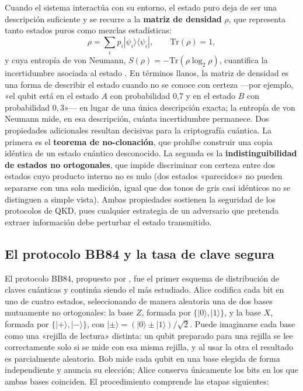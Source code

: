 \documentclass[12pt]{report}
\begin{document}
Cuando el sistema interactúa con su entorno, el estado puro deja de ser una
descripción suficiente y se recurre a la \textbf{matriz de densidad} $\rho$, que
representa tanto estados puros como mezclas estadísticas:
\begin{equation}
\rho = \sum_i p_i |\psi_i\rangle\langle\psi_i|, \qquad \mathrm{Tr}(\rho) = 1,
\label{eq:densidad}
\end{equation}
y cuya entropía de von Neumann, $S(\rho) = -\mathrm{Tr}(\rho \log_2 \rho)$,
cuantifica la incertidumbre asociada al estado \citep{nielsen2010}. En términos
llanos, la matriz de densidad es una forma de describir el estado cuando no se
conoce con certeza —por ejemplo, «el qubit está en el estado $A$ con probabilidad
0{,}7 y en el estado $B$ con probabilidad $0{,}3$»— en lugar de una única
descripción exacta; la entropía de von Neumann mide, en esa descripción, cuánta
incertidumbre permanece. Dos propiedades adicionales resultan decisivas para la
criptografía cuántica. La primera es el \textbf{teorema de no-clonación}, que
prohíbe construir una copia idéntica de un estado cuántico desconocido. La
segunda es la \textbf{indistinguibilidad de estados no ortogonales}, que impide
discriminar con certeza entre dos estados cuyo producto interno no es nulo (dos
estados «parecidos» no pueden separarse con una sola medición, igual que dos
tonos de gris casi idénticos no se distinguen a simple vista). Ambas propiedades
sostienen la seguridad de los protocolos de QKD, pues cualquier estrategia de un
adversario que pretenda extraer información debe perturbar el estado transmitido.

\subsection{El protocolo BB84 y la tasa de clave segura}

El protocolo BB84, propuesto por \citet{bennett1984}, fue el primer esquema de
distribución de claves cuánticas y continúa siendo el más estudiado. Alice
codifica cada bit en uno de cuatro estados, seleccionando de manera aleatoria
una de dos bases mutuamente no ortogonales: la base $Z$, formada por
$\{|0\rangle, |1\rangle\}$, y la base $X$, formada por
$\{|+\rangle, |-\rangle\}$, con
$|\pm\rangle = (|0\rangle \pm |1\rangle)/\sqrt{2}$. Puede imaginarse cada base
como una «rejilla de lectura» distinta: un qubit preparado para una rejilla se
lee correctamente solo si se mide con esa misma rejilla, y al usar la otra el
resultado es parcialmente aleatorio. Bob mide cada qubit en una base elegida de
forma independiente y anuncia su elección; Alice conserva únicamente los bits en
los que ambas bases coinciden. El procedimiento comprende las etapas siguientes:
\end{document}

